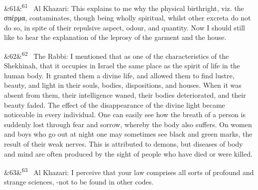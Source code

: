 \documentclass[12pt]{article}
\newcommand{\para}[1][]{\par\noindent\ifx&#1&\else\textsuperscript{\footnotesize #1}~\fi}
\begin{document}
\para[61] Al Khazari: This explains to me why the physical birthright, viz. the σπέρμα, contaminates, though being wholly spiritual, whilst other excreta do not do so, in spite of their repulsive aspect, odour, and quantity. Now I should still like to hear the explanation of the leprosy of the garment and the house.

\para[62] The Rabbi: I mentioned that as one of the characteristics of the Shekhinah, that it occupies in Israel the same place as the spirit of life in the human body. It granted them a divine life, and allowed them to find lustre, beauty, and light in their souls, bodies, dispositions, and houses. When it was absent from them, their intelligence waned, their bodies deteriorated, and their beauty faded. The effect of the disappearance of the divine light became noticeable in every individual. One can easily see how the breath of a person is suddenly lost through fear and sorrow, whereby the body also suffers. On women and boys who go out at night one may sometimes see black and green marks, the result of their weak nerves. This is attributed to demons, but diseases of body and mind are often produced by the sight of people who have died or were killed.

\para[63] Al Khazari: I perceive that your law comprises all sorts of profound and strange sciences, -not to be found in other codes.
\end{document}
